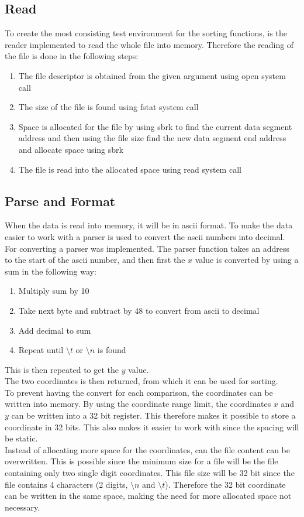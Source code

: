 \documentclass[12pt, a4paper]{article}
\begin{document}
		\subsection{Read}
		To create the most consisting test environment for the sorting functions, is the reader implemented to read the whole file into memory. Therefore the reading of the file is done in the following steps:
			\begin{enumerate}
				\addtolength\itemsep{-2mm}
					  \item The file descriptor is obtained from the given argument using open system call
						\item The size of the file is found using fstat system call
						\item Space is allocated for the file by using sbrk to find the current data segment address and then using the file size find the new data segment end address and allocate space using sbrk
						\item The file is read into the allocated space using read system call
			\end{enumerate}
		\subsection{Parse and Format}
			When the data is read into memory, it will be in ascii format. To make the data easier to work with a parser is used to convert the ascii numbers into decimal.\\
			For converting a parser was implemented. The parser function takes an address to the start of the ascii number, and then first the $x$ value is converted by using a sum in the following way:
			\begin{enumerate}
				\addtolength\itemsep{-2mm}
				\item Multiply sum by 10
				\item Take next byte and subtract by 48 to convert from ascii to decimal
				\item Add decimal to sum
				\item Repeat until $\setminus t$ or $\setminus n$ is found
			\end{enumerate}
			This is then repeated to get the $y$ value.\\[4mm]
			The two coordinates is then returned, from which it can be used for sorting.\\
			To prevent having the convert for each comparison, the coordinates can be written into memory. By using the coordinate range limit, the coordinates $x$ and $y$ can be written into a 32 bit register. This therefore makes it possible to store a coordinate in 32 bits. This also makes it easier to work with since the spacing will be static.\\
			Instead of allocating more space for the coordinates, can the file content can be overwritten. This is possible since the minimum size for a file will be the file containing only two single digit coordinates. This file size will be 32 bit since the file contains 4 characters (2 digits, $\setminus n$ and $\setminus t$). Therefore the 32 bit coordinate can be written in the same space, making the need for more allocated space not necessary.
\end{document}
